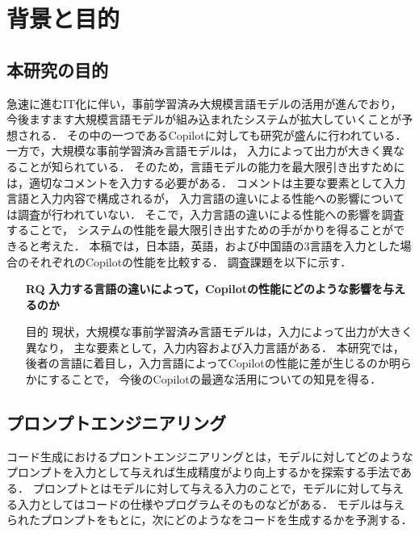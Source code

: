 \section{背景と目的\label{related_research}}

\subsection{本研究の目的}
  急速に進むIT化に伴い，事前学習済み大規模言語モデルの活用が進んでおり，
  今後ますます大規模言語モデルが組み込まれたシステムが拡大していくことが予想される．
  その中の一つであるCopilotに対しても研究が盛んに行われている\cite{Yao2022ACL}\cite{Nguyen2022MSR}\cite{Sobania2022GECCO}\cite{Dakhel2022arXiv}\cite{Vaithilingam2022CHI}．
  一方で，大規模な事前学習済み言語モデルは，
  入力によって出力が大きく異なることが知られている\cite{Yao2022ACL}．
  そのため，言語モデルの能力を最大限引き出すためには，適切なコメントを入力する必要がある．
  コメントは主要な要素として入力言語と入力内容で構成されるが，
  入力言語の違いによる性能への影響については調査が行われていない．
  そこで，入力言語の違いによる性能への影響を調査することで，
  システムの性能を最大限引き出すための手がかりを得ることができると考えた．
  本稿では，日本語，英語，および中国語の3言語を入力とした場合のそれぞれのCopilotの性能を比較する．
  調査課題を以下に示す．

  
  \begin{itemize}
    \item[\textbf{RQ}] \textbf{入力する言語の違いによって，Copilotの性能にどのような影響を与えるのか}
      \item[目的]{%
      現状，大規模な事前学習済み言語モデルは，入力によって出力が大きく異なり，
      主な要素として，入力内容および入力言語がある．
      本研究では，後者の言語に着目し，入力言語によってCopilotの性能に差が生じるのか明らかにすることで，
      今後のCopilotの最適な活用についての知見を得る．}
  \end{itemize}

\subsection{プロンプトエンジニアリング}
  コード生成におけるプロントエンジニアリングとは，モデルに対してどのようなプロンプトを入力として与えれば生成精度がより向上するかを探索する手法である．
  プロンプトとはモデルに対して与える入力のことで，モデルに対して与える入力としてはコードの仕様やプログラムそのものなどがある．
  モデルは与えられたプロンプトをもとに，次にどのようなをコードを生成するかを予測する．

